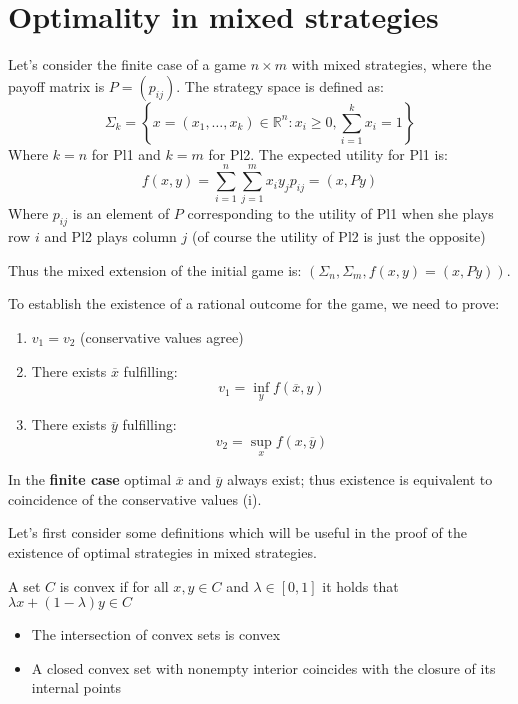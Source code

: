 \documentclass[../main.tex]{subfiles}
\begin{document}
\section{Optimality in mixed strategies}
Let's consider the finite case of a game $n \times m$ with mixed strategies, where the payoff matrix is $P = (p_{ij})$. The strategy space is defined as:
\[
    \Sigma_k = \left\{ x = (x_1, \ldots, x_k) \in \mathbb{R}^n : x_i \geq 0, \sum_{i=1}^k x_i = 1 \right\}
\]
Where $k = n$ for Pl1 and $k = m$ for Pl2. The expected utility for Pl1 is:
\[
    f(x,y) = \sum_{i=1}^n \sum_{j=1}^m x_i y_j p_{ij} = (x,Py)
\]
Where $p_{ij}$ is an element of $P$ corresponding to the utility of Pl1 when she plays
row $i$ and Pl2 plays column $j$ (of course the utility of Pl2 is just the opposite)

Thus the mixed extension of the initial game is: $(\Sigma_n, \Sigma_m, f(x,y) = (x, Py))$.

To establish the existence of a rational outcome for the game, we need to prove:
\begin{enumerate}[label=(\roman*)]
    \item $v_1 = v_2$ (conservative values agree)
    \item There exists $\overline{x}$ fulfilling:
          \[
              v_1 = \inf_y f(\overline{x}, y)
          \]
    \item There exists $\overline{y}$ fulfilling:
          \[
              v_2 = \sup_x f(x, \overline{y})
          \]
\end{enumerate}
In the \textbf{finite case} optimal $\overline{x}$ and $\overline{y}$ always exist; thus existence is equivalent to coincidence of the conservative values (i).

Let's first consider some definitions which will be useful in the proof of the existence of optimal strategies in mixed strategies.

\begin{definition}
    A set $C$ is convex if for all $x,y \in C$ and $\lambda \in [0,1]$ it holds that $\lambda x + (1-\lambda)y \in C$
\end{definition}

\begin{remark}
    \leavevmode
    \begin{itemize}
        \item The intersection of convex sets is convex
        \item A closed convex set with nonempty interior coincides with the closure of its internal points
    \end{itemize}
\end{remark}
\end{document}
